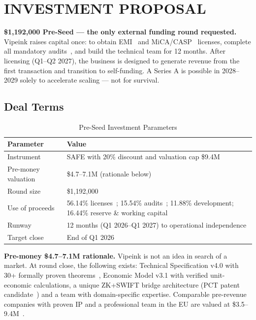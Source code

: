 \documentclass[11pt,a4paper]{article}
\begin{document}
\FloatBarrier
\section{INVESTMENT PROPOSAL}

\begin{tcolorbox}[insightbox, title={Investment Ask}]
\textbf{\$1,192,000 Pre-Seed --- the only external funding round requested.}
Vipeink raises capital once: to obtain EMI~\cite{lb_emi} and MiCA/CASP~\cite{mica_reg,esma_mica} licenses, complete all mandatory audits~\cite{tiber_eu,dora_reg,iso27001}, and build the technical team for 12 months. After licensing (Q1--Q2 2027), the business is designed to generate revenue from the first transaction and transition to self-funding. A Series A is possible in 2028--2029 solely to accelerate scaling --- not for survival.
\end{tcolorbox}

\vspace{0.6em}

\subsection*{Deal Terms}

\begin{table}[htbp]
\centering
\caption{Pre-Seed Investment Parameters}
\begin{tabularx}{\linewidth}{@{}lX@{}}
\toprule
\textbf{Parameter} & \textbf{Value} \\
\midrule
Instrument       & SAFE with 20\% discount and valuation cap \$9.4M \\
Pre-money valuation & \$4.7--7.1M (rationale below) \\
Round size       & \$1,192,000 \\
Use of proceeds  & 56.14\% licenses~\cite{lb_emi,mica_reg}; 15.54\% audits~\cite{tiber_eu,dora_reg,iso27001}; 11.88\% development; 16.44\% reserve \& working capital \\
Runway           & 12 months (Q1 2026--Q1 2027) to operational independence \\
Target close     & End of Q1 2026 \\
\bottomrule
\end{tabularx}
\end{table}

\noindent\textbf{Pre-money \$4.7--7.1M rationale.} Vipeink is not an idea in search of a market. At round close, the following exists: Technical Specification v4.0 with 30+ formally proven theorems~\cite{plonky2,groth16}, Economic Model v3.1 with verified unit-economic calculations, a unique ZK+SWIFT bridge architecture (PCT patent candidate~\cite{wipo_pct}) and a team with domain-specific expertise. Comparable pre-revenue companies with proven IP and a professional team in the EU are valued at \$3.5--9.4M~\cite{dealroom,pitchbook}.
\end{document}
